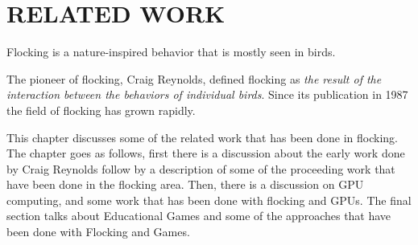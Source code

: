 \chapter{RELATED WORK}\label{chap2}


Flocking is a nature-inspired behavior that is mostly seen in birds. 

The pioneer of flocking, Craig Reynolds, defined flocking as \textit{the result of the interaction between the behaviors of individual birds}\cite{craig1}. Since its publication in 1987 the field of flocking has grown rapidly. %

This chapter discusses some of the related work that has been done in flocking. The chapter goes as follows, first there is a discussion about the early work done by Craig Reynolds follow by a description of some of the proceeding work that have been done in the flocking area. Then, there is a discussion on GPU computing, and some work that has been done with flocking and GPUs. The final section talks about Educational Games and some of the approaches that have been done with Flocking and Games.






